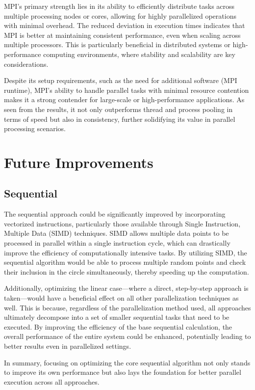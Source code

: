 \documentclass[a4paper, oneside]{article}
\begin{document}
MPI's primary strength lies in its ability to efficiently distribute tasks across multiple processing nodes or cores, allowing for highly parallelized operations with minimal overhead. The reduced deviation in execution times indicates that MPI is better at maintaining consistent performance, even when scaling across multiple processors. This is particularly beneficial in distributed systems or high-performance computing environments, where stability and scalability are key considerations.

Despite its setup requirements, such as the need for additional software (MPI runtime), MPI's ability to handle parallel tasks with minimal resource contention makes it a strong contender for large-scale or high-performance applications. As seen from the results, it not only outperforms thread and process pooling in terms of speed but also in consistency, further solidifying its value in parallel processing scenarios.

\section{Future Improvements}
\subsection{Sequential}
The sequential approach could be significantly improved by incorporating vectorized instructions, particularly those available through Single Instruction, Multiple Data (SIMD) techniques. SIMD allows multiple data points to be processed in parallel within a single instruction cycle, which can drastically improve the efficiency of computationally intensive tasks. By utilizing SIMD, the sequential algorithm would be able to process multiple random points and check their inclusion in the circle simultaneously, thereby speeding up the computation.

Additionally, optimizing the linear case—where a direct, step-by-step approach is taken—would have a beneficial effect on all other parallelization techniques as well. This is because, regardless of the parallelization method used, all approaches ultimately decompose into a set of smaller sequential tasks that need to be executed. By improving the efficiency of the base sequential calculation, the overall performance of the entire system could be enhanced, potentially leading to better results even in parallelized settings.

In summary, focusing on optimizing the core sequential algorithm not only stands to improve its own performance but also lays the foundation for better parallel execution across all approaches.
\end{document}
